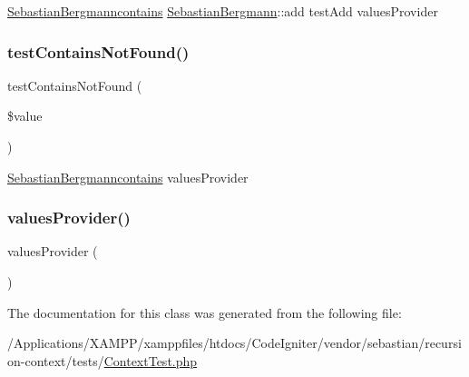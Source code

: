 \mbox{\hyperlink{namespace_sebastian_bergmann}{Sebastian\+Bergmann}}\mbox{\hyperlink{_functions_8php_a9dba79f2c57b5f522b794f8c0e029bec}{contains}}  \mbox{\hyperlink{namespace_sebastian_bergmann}{Sebastian\+Bergmann}}\+::add  test\+Add  values\+Provider \mbox{\label{class_sebastian_bergmann_1_1_recursion_context_1_1_context_test_a761c4a67baee648267e3ce6388bfada2}} 
\subsubsection{\texorpdfstring{test\+Contains\+Not\+Found()}{testContainsNotFound()}}
{\footnotesize\ttfamily test\+Contains\+Not\+Found (\begin{DoxyParamCaption}\item[{}]{\$value }\end{DoxyParamCaption})}

\mbox{\hyperlink{namespace_sebastian_bergmann}{Sebastian\+Bergmann}}\mbox{\hyperlink{_functions_8php_a9dba79f2c57b5f522b794f8c0e029bec}{contains}}  values\+Provider \mbox{\label{class_sebastian_bergmann_1_1_recursion_context_1_1_context_test_a442cef3392c43ed9b9650a5fd3cbfeef}} 
\subsubsection{\texorpdfstring{values\+Provider()}{valuesProvider()}}
{\footnotesize\ttfamily values\+Provider (\begin{DoxyParamCaption}{ }\end{DoxyParamCaption})}



The documentation for this class was generated from the following file\+:\begin{DoxyCompactItemize}
\item 
/\+Applications/\+X\+A\+M\+P\+P/xamppfiles/htdocs/\+Code\+Igniter/vendor/sebastian/recursion-\/context/tests/\mbox{\hyperlink{_context_test_8php}{Context\+Test.\+php}}\end{DoxyCompactItemize}

